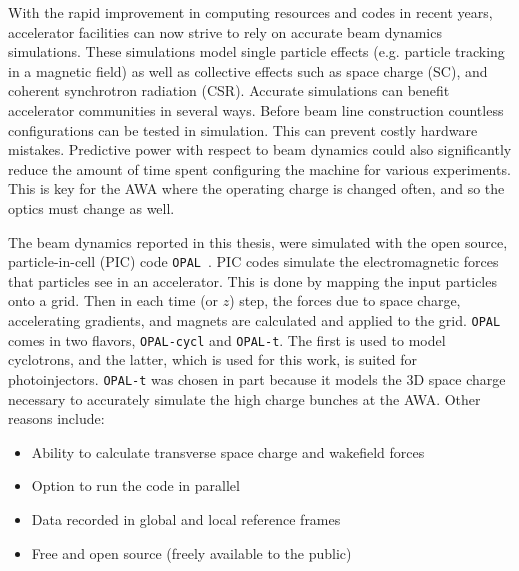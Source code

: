   \label{simulations}
\label{sec:code}

With the rapid improvement in computing resources and codes in recent years,  
accelerator facilities can now strive to rely on accurate beam dynamics simulations. 
These simulations model single particle effects 
(e.g. particle tracking in a magnetic field) as well as collective effects such as space charge (SC),  
and coherent synchrotron radiation (CSR).
Accurate simulations can benefit accelerator communities in several ways.
Before beam line construction countless configurations can be tested in simulation.
This can prevent costly hardware mistakes. 
Predictive power with respect to beam dynamics could also significantly reduce the amount of time 
spent configuring the machine for various experiments. This is key for the AWA
where the operating charge is changed often, and so the optics must change as well.

The beam dynamics reported in this thesis, were simulated with 
the open source, particle-in-cell (PIC) code \verb|OPAL|~\cite{opal}. 
PIC codes simulate the electromagnetic forces that particles see in an accelerator. 
This is done by mapping the input particles onto a grid. 
Then in each time (or $z$) step, the forces due to space charge, accelerating gradients, 
and magnets are calculated and applied to the grid.
\verb|OPAL| comes in two flavors, \verb|OPAL-cycl| and \verb|OPAL-t|. The first is used to model 
cyclotrons, and the latter, which is used for this work, is suited for photoinjectors. 
\verb|OPAL-t| was chosen in part because it models the 3D space charge necessary to accurately simulate the high charge bunches at the AWA. 
Other reasons include:
\begin{itemize}
	\item Ability to calculate transverse space charge and wakefield forces 
	\item Option to run the code in parallel
	\item Data recorded in global and local reference frames 
	\item Free and open source (freely available to the public)
\end{itemize} 

